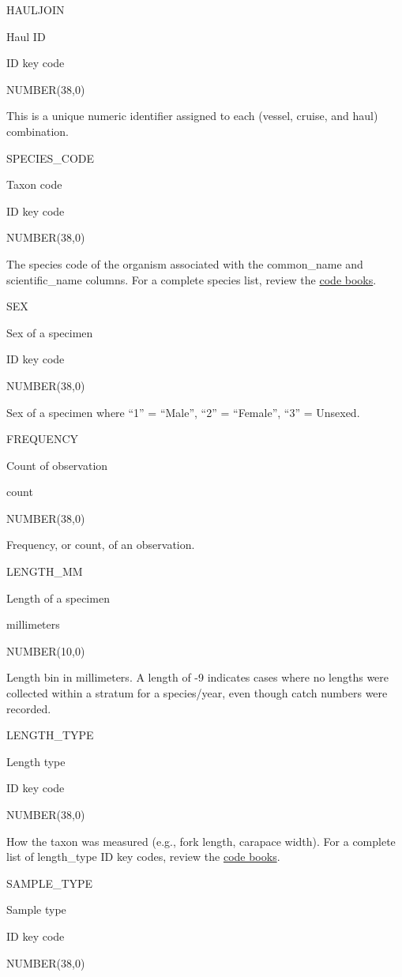 \documentclass[
  letterpaper,
  oneside,
  open=any]{scrbook}
\begin{document}
HAULJOIN

Haul ID

ID key code

NUMBER(38,0)

This is a unique numeric identifier assigned to each (vessel, cruise,
and haul) combination.

SPECIES\_CODE

Taxon code

ID key code

NUMBER(38,0)

The species code of the organism associated with the common\_name and
scientific\_name columns. For a complete species list, review the
\href{https://www.fisheries.noaa.gov/resource/document/groundfish-survey-species-code-manual-and-data-codes-manual}{code
books}.

SEX

Sex of a specimen

ID key code

NUMBER(38,0)

Sex of a specimen where ``1'' = ``Male'', ``2'' = ``Female'', ``3'' =
Unsexed.

FREQUENCY

Count of observation

count

NUMBER(38,0)

Frequency, or count, of an observation.

LENGTH\_MM

Length of a specimen

millimeters

NUMBER(10,0)

Length bin in millimeters. A length of -9 indicates cases where no
lengths were collected within a stratum for a species/year, even though
catch numbers were recorded.

LENGTH\_TYPE

Length type

ID key code

NUMBER(38,0)

How the taxon was measured (e.g., fork length, carapace width). For a
complete list of length\_type ID key codes, review the
\href{https://www.fisheries.noaa.gov/resource/document/groundfish-survey-species-code-manual-and-data-codes-manual}{code
books}.

SAMPLE\_TYPE

Sample type

ID key code

NUMBER(38,0)
\end{document}

